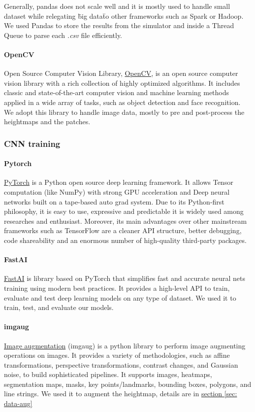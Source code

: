 \documentclass[../document.tex]{subfiles}
\begin{document}
Generally, pandas does not scale well and it is mostly used to handle small dataset while relegating \"big data\" to other frameworks such as Spark or Hadoop. We used Pandas to store the results from the simulator and inside a Thread Queue to parse each \emph{.csv} file efficiently.
\paragraph{OpenCV} Open Source Computer Vision Library, \href{https://opencv.org/}{OpenCV}, is an open source computer vision library with a rich collection of highly optimized algorithms. It includes classic and state-of-the-art computer vision and machine learning methods applied in a wide array of tasks, such as object detection and face recognition. We adopt this library to handle image data, mostly to pre and post-process the heightmaps and the patches.
\subsubsection{CNN training}
\paragraph{Pytorch }\href{https://pytorch.org/}{PyTorch} is a Python open source deep learning framework. It allows Tensor computation (like NumPy) with strong GPU acceleration and Deep neural networks built on a tape-based auto grad system. Due to its Python-first philosophy, it is easy to use, expressive and predictable it is widely used among researches and enthusiast. Moreover, its main advantages over other mainstream frameworks such as TensorFlow \cite{tensorflow} are a cleaner API structure, better debugging, code shareability and an enormous number of high-quality third-party packages.
\paragraph{FastAI}\href{https://course.fast.ai/}{FastAI} is library based on PyTorch that simplifies fast and accurate neural nets training using modern best practices. It provides a high-level API to train, evaluate and test deep learning models on any type of dataset. We used it to train, test, and evaluate our models.
\paragraph{imgaug}\href{https://imgaug.readthedocs.io/en/latest/}{Image augmentation} (imgaug) is a python library to perform image augmenting operations on images. It provides a variety of methodologies, such as affine transformations, perspective transformations, contrast changes, and Gaussian noise, to build sophisticated pipelines. It supports images,  heatmaps, segmentation maps, masks, key points/landmarks, bounding boxes, polygons, and line strings. We used it to augment the heightmap, details are in \hyperref[sec: data-aug]{section \ref{sec: data-aug}}
\end{document}
